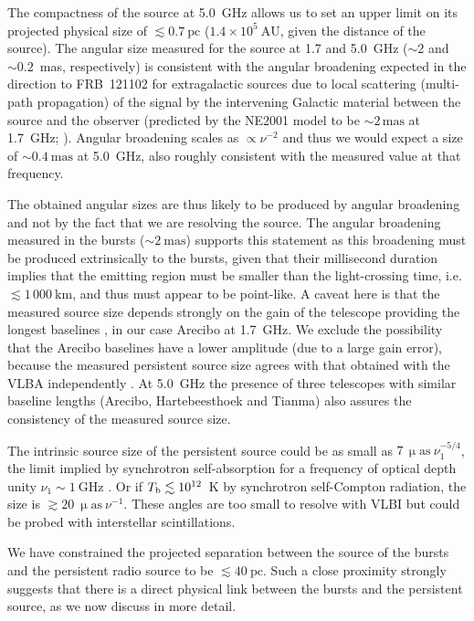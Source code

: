 \documentclass[twocolumn]{aastex61}
\newcommand{\frb}{FRB~121102\xspace}
\begin{document}
The compactness of the source at 5.0~GHz allows us to set an upper limit on its projected physical size of $\lesssim 0.7~\mathrm{pc}$ ($1.4 \times 10^5~\mathrm{AU}$, given the distance of the source).  The angular size measured for the source at 1.7 and 5.0~GHz ($\sim 2$ and $\sim 0.2$~mas, respectively) is consistent with the angular broadening expected in the direction to \frb for extragalactic sources due to local scattering (multi-path propagation) of the signal by the intervening Galactic material between the source and the observer (predicted by the NE2001 model to be $\sim 2\,\mathrm{mas}$ at 1.7~GHz; \citealt{cl02}).  Angular broadening scales as $\propto \nu^{-2}$ and thus we would expect a size of $\sim 0.4~\mathrm{mas}$ at 5.0~GHz, also roughly consistent with the measured value at that frequency.  

The obtained angular sizes are thus likely to be produced by angular broadening and not by the fact that we are resolving the source.  The angular broadening measured in the bursts ($\sim 2~\mathrm{mas}$) supports this statement as this broadening must be produced extrinsically to the bursts, given that their millisecond duration implies that the emitting region must be smaller than the light-crossing time, i.e. $\lesssim 1\,000\ \mathrm{km}$, and thus must appear to be point-like.  A caveat here is that the measured source size depends strongly on the gain of the telescope providing the longest baselines \citep{natarajan2016}, in our case Arecibo at 1.7~GHz. We exclude the possibility that the Arecibo baselines have a lower amplitude (due to a large gain error), because the measured persistent source size agrees with that obtained with the VLBA independently \citep{chatterjee2017}. At 5.0~GHz the presence of three telescopes with similar baseline lengths (Arecibo, Hartebeesthoek and Tianma) also assures the consistency of the measured source size.

The intrinsic source size of the persistent source could be as small as $7\,\mathrm{\upmu as}\ \nu_1^{-5/4}$, the limit implied by synchrotron self-absorption for a frequency of optical depth unity $\nu_1 \sim 1~\mathrm{GHz}$ \citep{harris1970}. Or if $T_{\rm b} \lesssim 10^{12}$~K by synchrotron self-Compton radiation, the size is $\gtrsim 20~\mathrm{\upmu as}\ \nu^{-1}$. These angles are too small to resolve with VLBI but could be probed with interstellar scintillations.

We have constrained the projected separation between the source of the bursts and the persistent radio source to be $\lesssim 40~\mathrm{pc}$.  Such a close proximity strongly suggests that there is a direct physical link between the bursts and the persistent source, as we now discuss in more detail.
\end{document}
